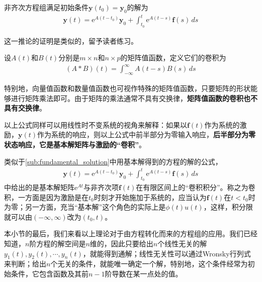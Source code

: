\begin{corollary}
    非齐次方程组满足初始条件$\mathbf{y}(t_0)=\mathbf{y}_0$的解为\begin{align*}
    \mathbf{y}(t)=\mathrm{e}^{A(t-t_0)}\mathbf{y}_0+\int_{t_0}^t \mathrm{e}^{A(t-s)}\mathbf{f}(s)\,ds
    \end{align*}
\end{corollary}

这一推论的证明是类似的，留予读者练习。

\begin{definition}[矩阵值函数的卷积]
    设$A(t)$和$B(t)$分别是$m\times n$和$n\times p$的矩阵值函数，定义它们的卷积为\begin{align*}
    (A*B)(t)=\int_{-\infty}^{\infty} A(t-s)B(s)\,ds
    \end{align*}
\end{definition}

特别地，向量值函数和数量值函数也可视作特殊的矩阵值函数，只要矩阵的形状能够进行矩阵乘法即可。由于矩阵的乘法通常不具有交换律，\textbf{矩阵值函数的卷积也不具有交换律}。

以上公式同样可以用线性时不变系统的视角来解释：如果以$\mathbf{f}(t)$作为系统的激励，$\mathbf{y}(t)$作为系统的响应，则以上公式中前半部分为零输入响应，\textbf{后半部分为零状态响应，它是基本解矩阵与激励的“卷积”}。

类似于\ref{sub:fundamental_solution}中用基本解得到的方程的解的公式，\begin{align*}
    \mathbf{y}(t)=\mathrm{e}^{A(t-t_0)}\mathbf{y}_0+\int_{t_0}^t \mathrm{e}^{A(t-s)}\mathbf{f}(s)\,ds
\end{align*}
中给出的是基本解矩阵$\mathrm{e}^{At}$与非齐次项$\mathbf{f}(t)$在有限区间上的“卷积积分”。称之为卷积，一方面是因为激励是在$t_0$时刻才开始施加于系统的，应当认为$\mathbf{f}(t)$在$t<t_0$时为零；另一方面，充当“基本解”这个角色的实际上是$\phi(t)u(t)$，这样，积分限就可以由$(-\infty,\infty)$改为$(t_0,t)$。

本小节的最后，我们来看以上理论对于由方程转化而来的方程组的应用。我们已经知道，$n$阶方程的解空间是$n$维的，因此只要给出$n$个线性无关的解$y_1(t),y_2(t),\cdots,y_n(t)$，就能得到通解；线性无关性可以通过Wronsky行列式来判断；给出$n$个无关的条件，就能唯一确定一个解，特别地，这个条件经常为初始条件，它包含函数及其前$n-1$阶导数在某一点处的值。


